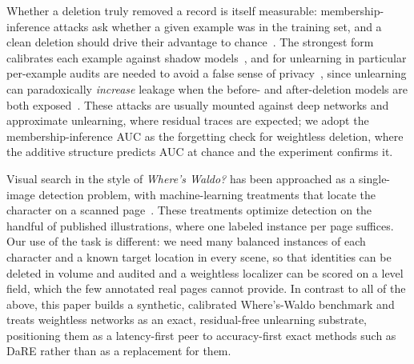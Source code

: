 Whether a deletion truly removed a record is itself measurable: membership-inference attacks ask whether a given example was in the training set, and a clean deletion should drive their advantage to chance~\cite{shokri2017mia}. The strongest form calibrates each example against shadow models~\cite{carlini2022lira}, and for unlearning in particular per-example audits are needed to avoid a false sense of privacy~\cite{hayes2024ulira}, since unlearning can paradoxically \emph{increase} leakage when the before- and after-deletion models are both exposed~\cite{chen2021mia}. These attacks are usually mounted against deep networks and approximate unlearning, where residual traces are expected; we adopt the membership-inference AUC as the forgetting check for weightless deletion, where the additive structure predicts AUC at chance and the experiment confirms it.

Visual search in the style of \emph{Where's Waldo?} has been approached as a single-image detection problem, with machine-learning treatments that locate the character on a scanned page~\cite{barthelmes2021wally}. These treatments optimize detection on the handful of published illustrations, where one labeled instance per page suffices. Our use of the task is different: we need many balanced instances of each character and a known target location in every scene, so that identities can be deleted in volume and audited and a weightless localizer can be scored on a level field, which the few annotated real pages cannot provide. In contrast to all of the above, this paper builds a synthetic, calibrated Where's-Waldo benchmark and treats weightless networks as an exact, residual-free unlearning substrate, positioning them as a latency-first peer to accuracy-first exact methods such as DaRE rather than as a replacement for them.
